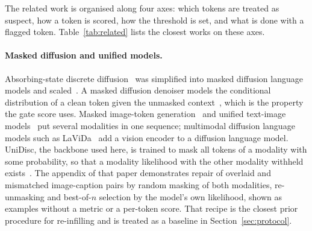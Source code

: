 
The related work is organised along four axes: which tokens are treated as suspect, how a token is scored, how the
threshold is set, and what is done with a flagged token.
Table~\ref{tab:related} lists the closest works on these axes.

\paragraph{Masked diffusion and unified models.}
Absorbing-state discrete diffusion~\cite{austin2021d3pm,lou2024sedd} was simplified into masked diffusion language models
\cite{sahoo2024mdlm} and scaled~\cite{nie2025llada}.
A masked diffusion denoiser models the conditional distribution of a clean token given the unmasked context~\cite{ou2025radd},
which is the property the gate score uses.
Masked image-token generation~\cite{chang2022maskgit} and unified text-image models~\cite{swerdlow2025unidisc,yang2025mmada,shi2025muddit}
put several modalities in one sequence; multimodal diffusion language models such as LaViDa~\cite{li2025lavida} add a vision encoder to a
diffusion language model.
UniDisc, the backbone used here, is trained to mask all tokens of a modality with some probability, so that a modality
likelihood with the other modality withheld exists~\cite{swerdlow2025unidisc}.
The appendix of that paper demonstrates repair of overlaid and mismatched image-caption pairs by random masking of both
modalities, re-unmasking and best-of-$n$ selection by the model's own likelihood, shown as examples without a metric or a
per-token score.
That recipe is the closest prior procedure for re-infilling and is treated as a baseline in Section~\ref{sec:protocol}.

